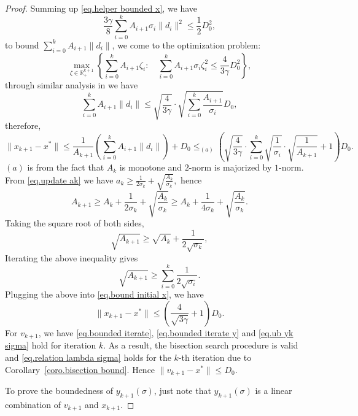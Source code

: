 \documentclass{article}
\numberwithin{equation}{section}
\numberwithin{equation}{section}
\begin{document}
\begin{proof}
    Summing up \eqref{eq.helper bounded x}, we have
    \begin{equation*}
        \frac{3\gamma}{8}\sum_{i=0}^k A_{i+1}\sigma_i \|d_i\|^2 \leq \frac{1}{2}D_0^2,
    \end{equation*}
    to bound $\sum_{i=0}^k A_{i+1}\|d_i\|$, we come to the optimization problem:
    \begin{equation*}
        \max _{\zeta \in \mathbb{R}^{k+1}_+}\left\{\sum_{i=0}^{k} A_{i+1}\zeta_i: \quad \sum_{i=0}^{k} A_{i+1} \sigma_i\zeta_i^2 \leq \frac{4}{3\gamma}D_0^2\right\},
    \end{equation*}
    through similar analysis in \citet[Lemma A.2]{monteiro2013accelerated} we have
    \begin{equation*}
        \sum_{i=0}^k A_{i+1}\|d_i\| \leq \sqrt{\frac{4}{3\gamma}}\cdot \sqrt{\sum_{i=0}^k \frac{A_{i+1}}{\sigma_i}} D_0,
    \end{equation*}
    therefore,
    \begin{equation}\label{eq.bound initial x}
        \|x_{k+1}-x^*\|  \leq \frac{1}{A_{k+1}}\left (\sum_{i=0}^k A_{i+1}\|d_i\|\right)+D_0  \leq_{(a)} \left(\sqrt{\frac{4}{3\gamma}}\cdot \sum_{i=0}^k\sqrt{\frac{1}{\sigma_i}}\cdot \sqrt{\frac{1}{A_{k+1}}} +1\right)D_0.
    \end{equation}
    $(a)$ is from the fact that $A_k$ is monotone and $2$-norm is majorized by $1$-norm. From \eqref{eq.update ak} we have
    \(
    a_k \geq \frac{1}{2\sigma_k}+\sqrt{\frac{A_k}{\sigma_k}},
    \)
    hence
    \begin{equation*}
        A_{k+1}\geq A_k+\frac{1}{2\sigma_k}+\sqrt{\frac{A_k}{\sigma_k}}\geq A_k+\frac{1}{4\sigma_k}+\sqrt{\frac{A_k}{\sigma_k}}.
    \end{equation*}
    Taking the square root of both sides,
    \begin{equation*}
        \sqrt{A_{k+1}}\geq \sqrt{A_k}+\frac{1}{2\sqrt{\sigma_k}},
    \end{equation*}
    Iterating the above inequality gives
    \begin{equation*}
        \sqrt{A_{k+1}}\geq \sum_{i=0}^k \frac{1}{2\sqrt{\sigma_i}}.
    \end{equation*}
    Plugging the above into \eqref{eq.bound initial x}, we have
    \begin{equation*}
        \|x_{k+1}-x^*\| \leq \left( \frac{4}{\sqrt{3\gamma}}+1\right) D_0.
    \end{equation*}
    For $v_{k+1}$, we have \eqref{eq.bounded iterate}, \eqref{eq.bounded iterate y} and \eqref{eq.ub yk sigma} hold for iteration $k$. As a result, the bisection search procedure is valid and \eqref{eq.relation lambda sigma} holds for the $k$-th iteration due to Corollary~\ref{coro.bisection bound}. Hence $\|v_{k+1}-x^*\|\leq D_0$.

    To prove the boundedness of $y_{k+1}(\sigma)$, just note that $y_{k+1}(\sigma)$ is a linear combination of $v_{k+1}$ and $x_{k+1}$.
\end{proof}

% 

\clearpage

\tableofcontents

\clearpage
\end{document}
